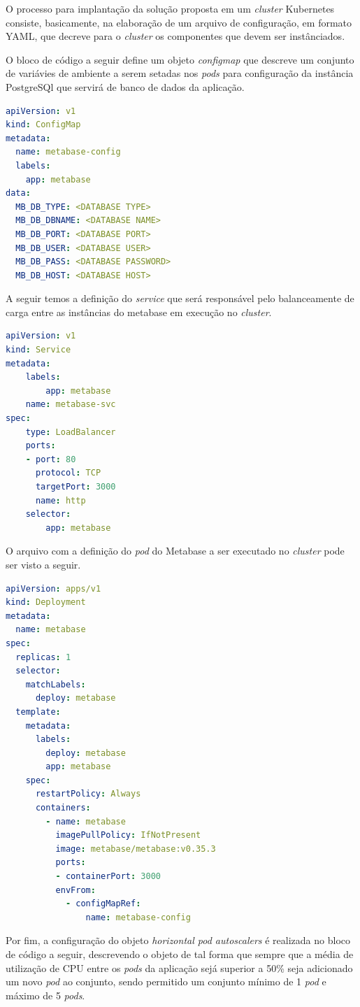 O processo para implantação da solução proposta em um \textit{cluster} Kubernetes consiste, basicamente, na elaboração de um arquivo de configuração, em formato YAML, que decreve para o \textit{cluster} os componentes que devem ser instânciados. 

O bloco de código a seguir define um objeto \textit{configmap} que descreve um conjunto de variávies de ambiente a serem setadas nos \textit{pods} para configuração da instância PostgreSQl que servirá de banco de dados da aplicação.

\begin{lstlisting}[language=yaml]
apiVersion: v1
kind: ConfigMap
metadata:
  name: metabase-config
  labels:
    app: metabase
data:
  MB_DB_TYPE: <DATABASE TYPE>
  MB_DB_DBNAME: <DATABASE NAME>
  MB_DB_PORT: <DATABASE PORT>
  MB_DB_USER: <DATABASE USER>
  MB_DB_PASS: <DATABASE PASSWORD>
  MB_DB_HOST: <DATABASE HOST>
\end{lstlisting} 

A seguir temos a definição do \textit{service} que será responsável pelo balanceamente de carga entre as instâncias do metabase em execução no \textit{cluster}.

\begin{lstlisting}[language=yaml]
apiVersion: v1
kind: Service
metadata:
    labels:
        app: metabase
    name: metabase-svc
spec:
    type: LoadBalancer
    ports:
    - port: 80
      protocol: TCP
      targetPort: 3000
      name: http
    selector:
        app: metabase
\end{lstlisting} 

O arquivo com a definição do \textit{pod} do Metabase a ser executado no \textit{cluster} pode ser visto a seguir.

\begin{lstlisting}[language=yaml]
apiVersion: apps/v1
kind: Deployment
metadata:
  name: metabase
spec:
  replicas: 1
  selector:
    matchLabels:
      deploy: metabase
  template:
    metadata:
      labels:
        deploy: metabase
        app: metabase
    spec:
      restartPolicy: Always
      containers:
        - name: metabase
          imagePullPolicy: IfNotPresent
          image: metabase/metabase:v0.35.3
          ports:
          - containerPort: 3000
          envFrom:
            - configMapRef:
                name: metabase-config
\end{lstlisting} 

Por fim, a configuração do objeto \textit{horizontal pod autoscalers} é realizada no bloco de código a seguir, descrevendo o objeto de tal forma que sempre que a média de utilização de CPU entre os \textit{pods} da aplicação sejá superior a 50\% seja adicionado um novo \textit{pod} ao conjunto, sendo permitido um conjunto mínimo de 1 \textit{pod} e máximo de 5 \textit{pods}. 

